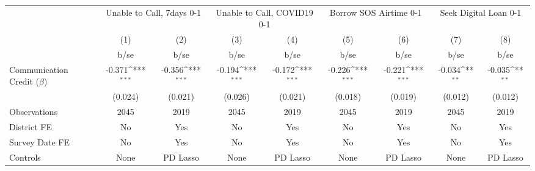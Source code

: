 {
\def\sym#1{\ifmmode^{#1}\else\(^{#1}\)\fi}
\begin{tabular}{l*{8}{c}}
\hline\hline
                                                  &\multicolumn{2}{c}{Unable to Call, 7days 0-1}&\multicolumn{2}{c}{Unable to Call, COVID19 0-1}&\multicolumn{2}{c}{Borrow SOS Airtime 0-1} &\multicolumn{2}{c}{Seek Digital Loan 0-1}  \\\cmidrule(lr){2-3}\cmidrule(lr){4-5}\cmidrule(lr){6-7}\cmidrule(lr){8-9}
                                                  &\multicolumn{1}{c}{(1)}         &\multicolumn{1}{c}{(2)}         &\multicolumn{1}{c}{(3)}         &\multicolumn{1}{c}{(4)}         &\multicolumn{1}{c}{(5)}         &\multicolumn{1}{c}{(6)}         &\multicolumn{1}{c}{(7)}         &\multicolumn{1}{c}{(8)}         \\
                                                  &        b/se         &        b/se         &        b/se         &        b/se         &        b/se         &        b/se         &        b/se         &        b/se         \\
\hline
Communication Credit ($\beta$)                    &      -0.371\sym{***}&      -0.356\sym{***}&      -0.194\sym{***}&      -0.172\sym{***}&      -0.226\sym{***}&      -0.221\sym{***}&      -0.034\sym{**} &      -0.035\sym{**} \\
                                                  &     (0.024)         &     (0.021)         &     (0.026)         &     (0.021)         &     (0.018)         &     (0.019)         &     (0.012)         &     (0.012)         \\
\hline
Observations                                      &        2045         &        2019         &        2045         &        2019         &        2045         &        2019         &        2045         &        2019         \\
District FE                                       &          No         &         Yes         &          No         &         Yes         &          No         &         Yes         &          No         &         Yes         \\
Survey Date FE                                    &          No         &         Yes         &          No         &         Yes         &          No         &         Yes         &          No         &         Yes         \\
Controls                                          &        None         &    PD Lasso         &        None         &    PD Lasso         &        None         &    PD Lasso         &        None         &    PD Lasso         \\

\end{tabular}}

